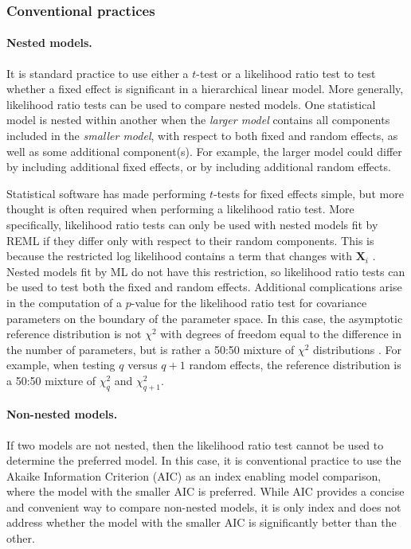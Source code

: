 \documentclass{article} %
\begin{document}
\subsubsection{Conventional practices}

\paragraph{Nested models.}
It is standard practice to use either a $t$-test or a likelihood ratio test to test whether a fixed effect is significant in a hierarchical linear model. More generally, likelihood ratio tests can be used to compare nested models. One statistical model is nested within another when the \emph{larger model} contains all components included in the \emph{smaller model}, with respect to both fixed and random effects, as well as some additional component(s). For example, the larger model could differ by including additional fixed effects, or by including additional random effects. 

Statistical software has made performing $t$-tests for fixed effects simple, but more thought is often required when performing a likelihood ratio test. More specifically, likelihood ratio tests can only be used with nested models fit by REML if they differ only with respect to their random components. This is because the restricted log likelihood contains a term that changes with $\bm{X}_i$ \citep[c.f.,][Section 2.2.5]{Pinhiero:2000vf}. Nested models fit by ML do not have this restriction, so likelihood ratio tests can be used to test both the fixed and random effects. Additional complications arise in the computation of a $p$-value for the likelihood ratio test for covariance parameters on the boundary of the parameter space. In this case, the asymptotic reference distribution is not $\chi^2$ with degrees of freedom equal to the difference in the number of parameters, but is rather a 50:50 mixture of $\chi^2$ distributions \citep{Self:1987wb, Stram:1994wd}. For example, when testing $q$ versus $q + 1$ random effects, the reference distribution is a 50:50 mixture of $\chi^2_q$ and $\chi^2_{q+1}$.

\paragraph{Non-nested models.}
If two models are not nested, then the likelihood ratio test cannot be used to determine the preferred model. In this case, it is conventional practice to use the Akaike Information Criterion (AIC) as an index enabling model comparison, where the model with the smaller AIC is preferred. While AIC provides a concise and convenient way to compare non-nested models, it is only index and does not address whether the model with the smaller AIC is significantly better than the other.
\end{document}
